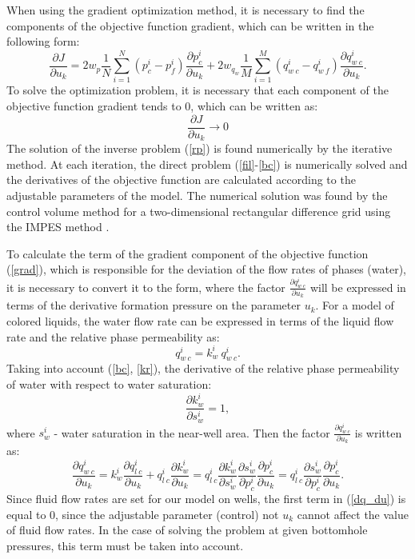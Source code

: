 \documentclass[
11pt,%
tightenlines,%
twoside,%
onecolumn,%
nofloats,%
nobibnotes,%
nofootinbib,%
superscriptaddress,%
noshowpacs,%
centertags]%
{revtex4}
\begin{document}
When using the gradient optimization method, it is necessary to find the components of the objective function gradient, which can be written in the following form:
\begin{equation}\label{grad}
\frac{\partial J}{\partial u_k} = 2w_p\frac{1}{N}\sum_{i=1}^N ({p_c^i-p_f^i})\frac{\partial p_c^i}{\partial u_k}+2w_{q_w}\frac{1}{M}\sum_{i=1}^M{\left(q_{w\:c}^i-q_{w\:f}^i\right)}\frac{\partial q_{w\:c}^i}{\partial u_k}.
\end{equation}
To solve the optimization problem, it is necessary that each component of the objective function gradient tends to 0, which can be written as:
\begin{equation} \label{rp}
	 \frac{\partial J}{\partial u_k} \rightarrow 0
\end{equation}
The solution of the inverse problem (\ref{rp}) is found numerically by the iterative method. At each iteration, the direct problem (\ref{fil}-\ref{bc}) is numerically solved and the derivatives of the objective function are calculated according to the adjustable parameters of the \cite{opt} model. The numerical solution was found by the control volume method for a two-dimensional rectangular difference grid using the IMPES method \cite{azi}.

To calculate the term of the gradient component of the objective function (\ref{grad}), which is responsible for the deviation of the flow rates of phases (water), it is necessary to convert it to the form, where the factor $\frac{\partial q_{w\:c}^i}{\partial u_k}$ will be expressed in terms of the derivative formation pressure on the parameter $u_k$. For a model of colored liquids, the water flow rate can be expressed in terms of the liquid flow rate and the relative phase permeability as:
 \begin{equation*}
 	q_{w\:c}^i = k_{w}^i \: q_{w\:c}^i.
 \end{equation*}
Taking into account (\ref{bc}, \ref{kr}), the derivative of the relative phase permeability of water with respect to water saturation:
 \begin{equation*}
	\frac{\partial k_{w}^i}{\partial s_w^i} = 1,
\end{equation*}
where $s_w^i$ - water saturation in the near-well area.
Then the factor $\frac{\partial q_{w\:c}^i}{\partial u_k}$ is written as:
\begin{equation} \label{dq_du}
\frac{\partial q_{w\:c}^i}{\partial u_k} = k_{w}^i \frac{\partial q_{l\:c}^i}{\partial u_k} + q_{l\:c}^i \frac{\partial k_{w}^i}{\partial u_k} = q_{l\:c}^i \frac{\partial k_{w}^i}{\partial s_w^i} \frac{\partial s_w^i}{\partial p_c^i}\frac{\partial p_c^i}{\partial u_k} =  q_{l\:c}^i  \frac{\partial s_w^i}{\partial p_c^i}\frac{\partial p_c^i}{\partial u_k}.
\end{equation}
Since fluid flow rates are set for our model on wells, the first term in (\ref{dq_du}) is equal to 0, since the adjustable parameter (control) not $u_k$ cannot affect the value of fluid flow rates. In the case of solving the problem at given bottomhole pressures, this term must be taken into account.
\end{document}
